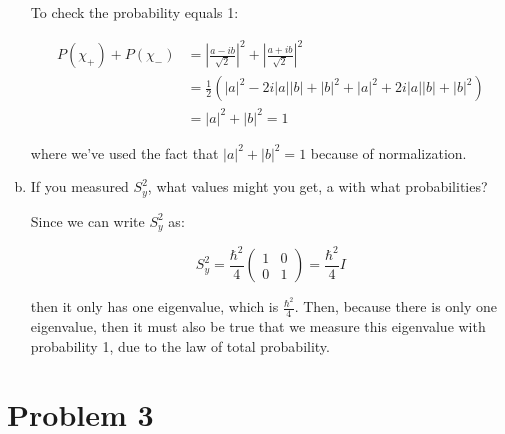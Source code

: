 \documentclass[10pt]{article}
\begin{document}
\begin{enumerate}[(a)]
\begin{solution}
            To check the probability equals 1: 

            \begin{align*}
                P(\chi_+) + P(\chi_-) &= \left|\frac{a - ib}{\sqrt 2}\right|^2 + \left|\frac{a + ib}{\sqrt 2}\right|^2\\
                &= \frac{1}{2}(|a|^2 - 2i|a||b| + |b|^2 + |a|^2 + 2i|a||b| + |b|^2)\\
                &= |a|^2 + |b|^2 = 1
            \end{align*}

            where we've used the fact that $|a|^2 + |b|^2 = 1$ because of normalization.
        \end{solution}
        \item If you measured $S_y^2$, what values might you get, a with what probabilities?
        
        \begin{solution}
            Since we can write $S_y^2$ as: 

            \[ S_y^2 = \frac{\hbar^2}{4} \begin{pmatrix}
                1 & 0\\
                0 & 1
            \end{pmatrix} = \frac{\hbar^2}{4}I\] 

            then it only has one eigenvalue, which is $\frac{\hbar^2}{4}$. Then, because there is only one eigenvalue, then it must also be true that we measure this eigenvalue with probability 1, due to the law of total probability.
        \end{solution}
    \end{enumerate}


    \pagebreak 

    \section*{Problem 3}
\end{document}
